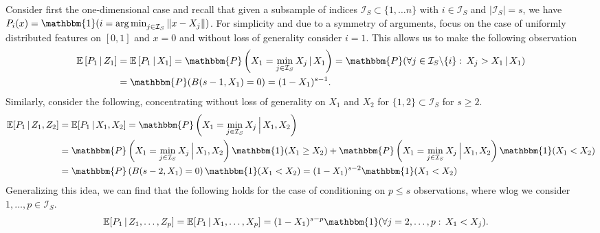 \documentclass[letterpaper,10pt]{article}
\numberwithin{equation}{section}
\numberwithin{thm}{section}
\newcommand{\E}{\mathbb{E}}
\newcommand{\1}{\mathbb{1}}
\renewcommand{\P}{\mathbbm{P}}
\DeclareMathOperator*{\argmin}{arg\,min} %
\begin{document}
Consider first the one-dimensional case and recall that given a subsample of indices $\mathcal{I}_S \subset \{1, \dotsc n\}$ with $i \in \mathcal{I}_S$ and $|\mathcal{I}_S| = s$, we have $P_i(x) = \mathbbm{1}(i = \argmin_{j \in \mathcal{I}_S} \|x - X_{j}\|)$.
For simplicity and due to a symmetry of arguments, focus on the case of uniformly distributed features on $[0,1]$ and $x = 0$ and without loss of generality consider $i = 1$.
This allows us to make the following observation
\begin{equation*}
	\begin{aligned}
		\E\left[P_1 \, | \, Z_1\right]
		 & = \E\left[P_1 \, | \, X_1\right]
		= \P\left(X_1 = \min_{j \in \mathcal{I}_S} X_j \, | \, X_1\right)
		= \P(\forall j \in \mathcal{I}_S \backslash \{i\}: \, X_j > X_1 \, | \, X_1) \\
		 & = \P(B(s-1, X_1) = 0)
		= (1-X_1)^{s-1}.
	\end{aligned}
\end{equation*}
Similarly, consider the following, concentrating without loss of generality on $X_1$ and $X_2$ for $\{1,2\} \subset \mathcal{I}_S$ for $s \geq 2$.
\begin{equation*}
	\begin{aligned}
		\E[P_1 \, | \, Z_1, Z_2]
		 & = \E[P_1 \, | \, X_1, X_2]
		= \P\left(X_1 = \min_{j \in \mathcal{I}_S} X_j \, \Big| \, X_1, X_2\right)                              \\
		 & = \P\left(X_1 = \min_{j \in \mathcal{I}_S} X_j \, \Big| \, X_1, X_2\right) \mathbbm{1}(X_1 \geq X_2)
		+ \P\left(X_1 = \min_{j \in \mathcal{I}_S} X_j \, \Big| \, X_1, X_2\right) \mathbbm{1}(X_1 < X_2)       \\
		 & = \P\left(B(s-2, X_1) = 0\right) \mathbbm{1}(X_1 < X_2)
		= (1 - X_1)^{s-2} \mathbbm{1}(X_1 < X_2)                                                                \\
	\end{aligned}
\end{equation*}
Generalizing this idea, we can find that the following holds for the case of conditioning on $p \leq s $ observations, where wlog we consider $1, \dotsc, p \in \mathcal{I}_S$.
\begin{equation*}
	\begin{aligned}
		\E[P_1 \, | \, Z_1, \dotsc, Z_p]
		 & = \E[P_1 \, | \, X_1, \dotsc, X_p]
		= (1 - X_1)^{s-p} \mathbbm{1}(\forall j = 2, \dotsc, p: \, X_1 < X_j).
	\end{aligned}
\end{equation*}
\end{document}
